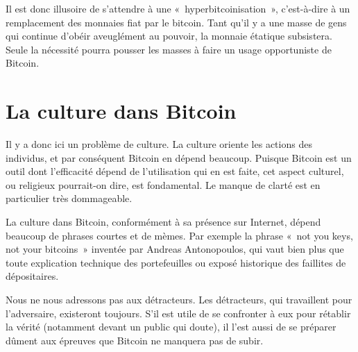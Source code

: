 Il est donc illusoire de s'attendre à une «~hyperbitcoinisation~», c'est-à-dire à un remplacement des monnaies fiat par le bitcoin. Tant qu'il y a une masse de gens qui continue d'obéir aveuglément au pouvoir, la monnaie étatique subsistera. Seule la nécessité pourra pousser les masses à faire un usage opportuniste de Bitcoin.

\section*{La culture dans Bitcoin}

Il y a donc ici un problème de culture. La culture oriente les actions des individus, et par conséquent Bitcoin en dépend beaucoup. Puisque Bitcoin est un outil dont l'efficacité dépend de l'utilisation qui en est faite, cet aspect culturel, ou religieux pourrait-on dire, est fondamental. Le manque de clarté est en particulier très dommageable.

%
La culture dans Bitcoin, conformément à sa présence sur Internet, dépend beaucoup de phrases courtes et de mèmes. Par exemple la phrase «~not you keys, not your bitcoins~» inventée par Andreas Antonopoulos, qui vaut bien plus que toute explication technique des portefeuilles ou exposé historique des faillites de dépositaires.


Nous ne nous adressons pas aux détracteurs. Les détracteurs, qui travaillent pour l'adversaire, existeront toujours. S'il est utile de se confronter à eux pour rétablir la vérité (notamment devant un public qui doute), il l'est aussi de se préparer dûment aux épreuves que Bitcoin ne manquera pas de subir.

